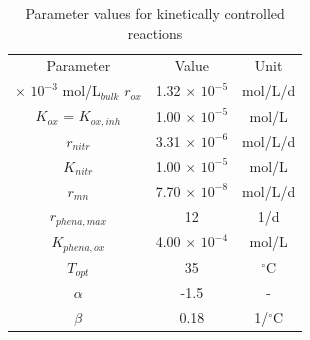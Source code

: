 \begin{table}[b]
\caption{Parameter values for kinetically controlled reactions}
\begin{center}
\begin{tabular}{ccc}
\toprule
  Parameter             &  Value    &    Unit   \\  $\times$ $10^{-3}$ mol/L$_{bulk}$
$r_{ox}$                & 1.32 $\times$ $10^{-5}$  & mol/L/d   \\
$K_{ox}$ = $K_{ox,inh}$ & 1.00 $\times$ $10^{-5}$  & mol/L     \\
$r_{nitr}$              & 3.31 $\times$ $10^{-6}$  & mol/L/d   \\
$K_{nitr}$              & 1.00 $\times$ $10^{-5}$  & mol/L     \\
$r_{mn}$                & 7.70 $\times$ $10^{-8}$  & mol/L/d   \\
$r_{phena,max}$         & 12        & 1/d       \\
$K_{phena,ox}$          & 4.00 $\times$ $10^{-4}$  & mol/L     \\
$T_{opt}$               & 35        & $^{\circ}$C   \\
${\alpha}$            & -1.5      & -             \\
${\beta}$             & 0.18      & 1/$^{\circ}$C \\
 \bottomrule
\end{tabular}
\label{parm_values_berlin}
\end{center}
\end{table}

